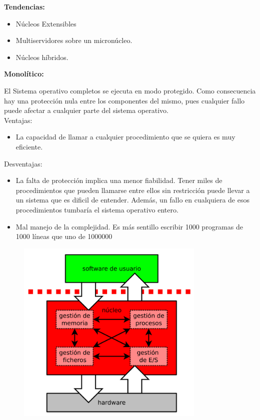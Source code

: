 \documentclass{article}
\begin{document}
\textbf{Tendencias:}
\begin{itemize}
\item Núcleos Extensibles

\item Multiservidores sobre un micronúcleo.

\item Núcleos híbridos.
\end{itemize}

\textbf{Monolítico:}

El Sistema operativo completos se ejecuta en modo protegido. Como consecuencia hay una protección nula entre los componentes del mismo, pues cualquier fallo puede afectar a cualquier parte del sistema operativo.\\

Ventajas:
\begin{itemize}
\item La capacidad de llamar a cualquier procedimiento que se quiera es muy eficiente.
\end{itemize}

Desventajas:
\begin{itemize}
\item La falta de protección implica una menor fiabilidad. Tener miles de procedimientos que pueden llamarse entre ellos sin restricción puede llevar a un sistema que es  dificil de entender. Además, un fallo en cualquiera de esos procedimientos tumbaría el sistema operativo entero. 

\item Mal manejo de la complejidad. Es más sentillo escribir 1000 programas de 1000 líneas que uno de 1000000
\end{itemize}

\begin{figure}[h]
\centering
\includegraphics[scale=1, width=90mm]{monolitico.png}
\end{figure}
\end{document}
